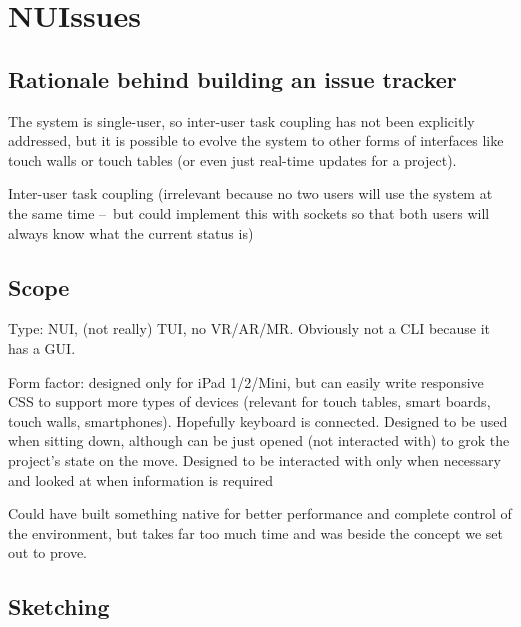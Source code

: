 \section{NUIssues}

\subsection{Rationale behind building an issue tracker}

The system is single-user, so inter-user task coupling has not been explicitly addressed, but it is possible to evolve the system to other forms of interfaces like touch walls or touch tables (or even just real-time updates for a project).

Inter-user task coupling (irrelevant because no two users will use the system at the same time – but could implement this with sockets so that both users will always know what the current status is)

\subsection{Scope}

Type: NUI, (not really) TUI, no VR/AR/MR. Obviously not a CLI because it has a GUI.

Form factor: designed only for iPad 1/2/Mini, but can easily write responsive CSS to support more types of devices (relevant for touch tables, smart boards, touch walls, smartphones). Hopefully keyboard is connected. Designed to be used when sitting down, although can be just opened (not interacted with) to grok the project's state on the move. Designed to be interacted with only when necessary and looked at when information is required

Could have built something native for better performance and complete control of the environment, but takes far too much time and was beside the concept we set out to prove.

\subsection{Sketching}

